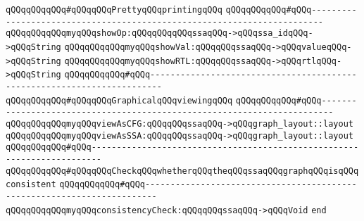 \verb|qQQqqQQqqQQq#qQQqqQQqPrettyqQQqprintingqQQq|\newline
\verb|qQQqqQQqqQQq#qQQq------------------------------------------------------------------------|\newline
\verb|qQQqqQQqqQQqmyqQQqshowOp:qQQqqQQqqQQqssaqQQq->qQQqssa_idqQQq->qQQqString|\newline
\verb|qQQqqQQqqQQqmyqQQqshowVal:qQQqqQQqssaqQQq->qQQqvalueqQQq->qQQqString|\newline
\verb|qQQqqQQqqQQqmyqQQqshowRTL:qQQqqQQqssaqQQq->qQQqrtlqQQq->qQQqString|\newline
\newline
\verb|qQQqqQQqqQQq#qQQq------------------------------------------------------------------------|\newline
\verb|qQQqqQQqqQQq#qQQqqQQqGraphicalqQQqviewingqQQq|\newline
\verb|qQQqqQQqqQQq#qQQq------------------------------------------------------------------------|\newline
\verb|qQQqqQQqqQQqmyqQQqviewAsCFG:qQQqqQQqssaqQQq->qQQqgraph_layout::layout|\newline
\verb|qQQqqQQqqQQqmyqQQqviewAsSSA:qQQqqQQqssaqQQq->qQQqgraph_layout::layout|\newline
\newline
\verb|qQQqqQQqqQQq#qQQq------------------------------------------------------------------------|\newline
\verb|qQQqqQQqqQQq#qQQqqQQqCheckqQQqwhetherqQQqtheqQQqssaqQQqgraphqQQqisqQQqconsistent|\newline
\verb|qQQqqQQqqQQq#qQQq------------------------------------------------------------------------|\newline
\verb|qQQqqQQqqQQqmyqQQqconsistencyCheck:qQQqqQQqssaqQQq->qQQqVoid|\newline
\verb|end|\newline
\newline

